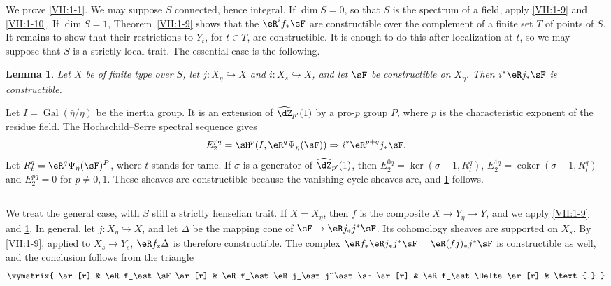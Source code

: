 \documentclass[12pt,oneside,english]{smfbook}
\DeclareMathOperator{\gal}{Gal}
\newcounter{char}
\newtheorem{lemma_}[subsection]{Lemma}
\begin{document}
We prove \ref{VII:1-1}. We may suppose $S$ connected, hence integral. If $\dim S=0$, so that $S$ is the spectrum of a field, apply \ref{VII:1-9} and \ref{VII:1-10}. If $\dim S=1$, Theorem~\ref{VII:1-9} shows that the $\eR^if_\ast\sF$ are constructible over the complement of a finite set $T$ of points of $S$. It remains to show that their restrictions to $Y_t$, for $t\in T$, are constructible. It is enough to do this after localization at $t$, so we may suppose that $S$ is a strictly local trait. The essential case is the following.

\begin{lemma_}\label{VII:3-11}
Let $X$ be of finite type over $S$, let $j:X_\eta\hookrightarrow X$ and $i:X_s\hookrightarrow X$, and let $\sF$ be constructible on $X_\eta$. Then $i^\ast\eR j_\ast\sF$ is constructible.
\end{lemma_}

Let $I=\gal(\bar\eta/\eta)$ be the inertia group. It is an extension of $\widehat\dZ_{p'}(1)$ by a pro-$p$ group $P$, where $p$ is the characteristic exponent of the residue field. The Hochschild--Serre spectral sequence gives
\[
  E_2^{p q} = \sH^p(I,\eR^q\Psi_\eta(\sF))\Rightarrow i^\ast \eR^{p+q}j_\ast\sF \text{.}
\]
Let $R_t^q=\eR^q\Psi_\eta(\sF)^P$, where $t$ stands for tame. If $\sigma$ is a generator of $\widehat\dZ_{p'}(1)$, then $E_2^{0 q} = \ker(\sigma-1,R_t^q)$, $E_2^{1 q} = \operatorname{coker}(\sigma-1,R_t^q)$ and $E_2^{p q} = 0$ for $p\ne0,1$. These sheaves are constructible because the vanishing-cycle sheaves are, and \ref{VII:3-11} follows.

\subsection{}\label{VII:3-12}

We treat the general case, with $S$ still a strictly henselian trait. If $X=X_\eta$, then $f$ is the composite $X\to Y_\eta\to Y$, and we apply \ref{VII:1-9} and \ref{VII:3-11}. In general, let $j:X_\eta\hookrightarrow X$, and let $\Delta$ be the mapping cone of $\sF\to\eR j_\ast j^\ast\sF$. Its cohomology sheaves are supported on $X_s$. By \ref{VII:1-9}, applied to $X_s\to Y_s$, $\eR f_\ast\Delta$ is therefore constructible. The complex $\eR f_\ast\eR j_\ast j^\ast\sF =\eR(fj)_\ast j^\ast\sF$ is constructible as well, and the conclusion follows from the triangle
\[\xymatrix{
  \ar[r]
    & \eR f_\ast \sF \ar[r]
    & \eR f_\ast \eR j_\ast j^\ast \sF \ar[r]
    & \eR f_\ast \Delta \ar[r]
    & \text{.}
}\]
\end{document}
